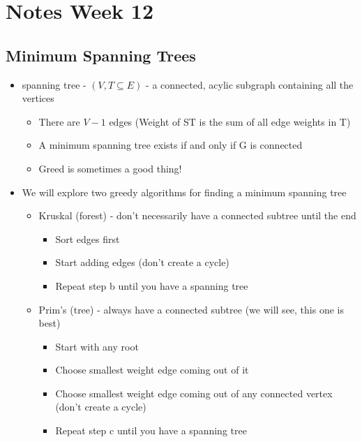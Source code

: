 \documentclass[12pt]{article}
\begin{document}
\section*{Notes Week 12}

\subsection*{Minimum Spanning Trees}

\begin{itemize}

    \item spanning tree - $(V, T \subseteq E)$ - a connected, acylic subgraph containing all the vertices
    \begin{itemize}
      \item There are $V - 1$ edges (Weight of ST is the sum of all edge weights in T)
      \item A minimum spanning tree exists if and only if G is connected
      \item Greed is sometimes a good thing!
    \end{itemize}

    \item We will explore two greedy algorithms for finding a minimum spanning tree
    \begin{itemize}
      \item Kruskal (forest) - don't necessarily have a connected subtree until the end
      \begin{itemize}
        \item Sort edges first
        \item Start adding edges (don't create a cycle)
        \item Repeat step b until you have a spanning tree
      \end{itemize}

      \item Prim's (tree) - always have a connected subtree (we will see, this one is best)
      \begin{itemize}
        \item Start with any root
        \item Choose smallest weight edge coming out of it
        \item Choose smallest weight edge coming out of any connected vertex (don't create a cycle)
        \item Repeat step c until you have a spanning tree
      \end{itemize}
    \end{itemize}

\end{itemize}
\end{document}
